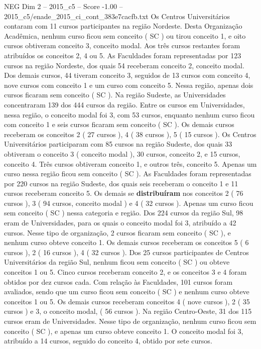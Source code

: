 \begin{textsample}{NEG Dim 2 – 2015\_c5 – Score -1.00 – 2015\_c5/enade\_2015\_ci\_cont\_383e7cacfb.txt}
Os Centros Universitários contaram com 11 cursos participantes na região Nordeste.
Desta Organização Acadêmica, nenhum curso ficou sem conceito ( SC ) ou tirou conceito 1, e oito cursos obtiveram conceito 3, conceito modal.
Aos três cursos restantes foram atribuídos os conceitos 2, 4 ou 5.
As Faculdades foram representadas por 123 cursos na região Nordeste, dos quais 54 receberam conceito 2, conceito modal.
Dos demais cursos, 44 tiveram conceito 3, seguidos de 13 cursos com conceito 4, nove cursos com conceito 1 e um curso com conceito 5.
Nessa região, apenas dois cursos ficaram sem conceito ( SC ).
Na região Sudeste, as Universidades concentraram 139 dos 444 cursos da região.
Entre os cursos em Universidades, nessa região, o conceito modal foi 3, com 53 cursos, enquanto nenhum curso ficou com conceito 1 e seis cursos ficaram sem conceito ( SC ).
Os demais cursos receberam os conceitos 2 ( 27 cursos ), 4 ( 38 cursos ), 5 ( 15 cursos ).
Os Centros Universitários participaram com 85 cursos na região Sudeste, dos quais 33 obtiveram o conceito 3 ( conceito modal ), 30 cursos, conceito 2, e 15 cursos, conceito 4.
Três cursos obtiveram conceito 1, e outros três, conceito 5.
Apenas um curso nessa região ficou sem conceito ( SC ).
As Faculdades foram representadas por 220 cursos na região Sudeste, dos quais seis receberam o conceito 1 e 11 cursos receberam conceito 5.
Os demais se \textbf{distribuíram} nos conceitos 2 ( 76 cursos ), 3 ( 94 cursos, conceito modal ) e 4 ( 32 cursos ).
Apenas um curso ficou sem conceito ( SC ) nessa categoria e região.
Dos 224 cursos da região Sul, 98 eram de Universidades, para os quais o conceito modal foi 3, atribuído a 42 cursos.
Nesse tipo de organização, 2 cursos ficaram sem conceito ( SC ), e nenhum curso obteve conceito 1.
Os demais cursos receberam os conceitos 5 ( 6 cursos ), 2 ( 16 cursos ), 4 ( 32 cursos ).
Dos 25 cursos participantes de Centros Universitários da região Sul, nenhum ficou sem conceito ( SC ) ou obteve conceitos 1 ou 5.
Cinco cursos receberam conceito 2, e os conceitos 3 e 4 foram obtidos por dez cursos cada.
Com relação às Faculdades, 101 cursos foram avaliados, sendo que um curso ficou sem conceito ( SC ) e nenhum curso obteve conceitos 1 ou 5.
Os demais cursos receberam conceitos 4 ( nove cursos ), 2 ( 35 cursos ) e 3, o conceito modal, ( 56 cursos ).
Na região Centro-Oeste, 31 dos 115 cursos eram de Universidades.
Nesse tipo de organização, nenhum curso ficou sem conceito ( SC ), e apenas um curso obteve conceito 1.
O conceito modal foi 3, atribuído a 14 cursos, seguido do conceito 4, obtido por sete cursos.

\end{textsample}
